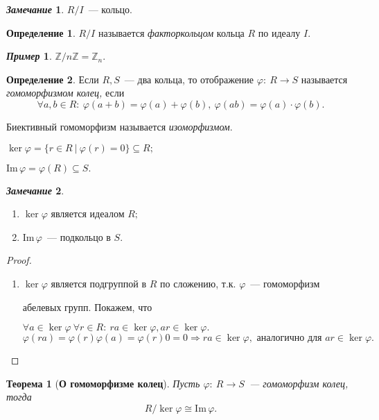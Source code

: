 \documentclass[a4paper, 14pt]{extarticle}
\newcommand{\n}{\par}
\newcommand{\integers}{\mathbb{Z}}
\newcommand{\im}{\mathrm{Im} \,}
\renewcommand{\phi}{\varphi}
\theoremstyle{definition}
\newtheorem*{exmpl*}{\textit{Пример}}
\newtheorem*{remark}{\textit{Замечание}}
\newtheorem{definition}{Определение}
\theoremstyle{plain}
\newtheorem*{theorem*}{Теорема}
\numberwithin{theorem}{section}
\numberwithin{definition}{section}
\numberwithin{statement}{section}
\numberwithin{lemma}{section}
\numberwithin{consequence}{section}
\begin{document}
	\begin{remark}
		$R/I$~--- кольцо.
	\end{remark}
	\begin{definition}
		$R/I$ называется \textit{факторкольцом} кольца $R$ по идеалу $I.$
	\end{definition}
	\begin{exmpl*}
		$\integers/n\integers = \integers_n.$
	\end{exmpl*}
	\begin{definition}
		Если $R, S$~--- два кольца, то отображение ${\phi{:} \ R \rightarrow S}$ называется \textit{гомоморфизмом колец,} если
		\begin{equation*}
			\forall a,b \in R{:} \ \phi(a + b) = \phi(a) + \phi(b), \ \phi(ab) = \phi(a) \cdot \phi(b).
		\end{equation*} \n
		Биективный гомоморфизм называется \textit{изоморфизмом}.\n
		${\ker \phi = \{r \in R \ | \ \phi(r) = 0\} \subseteq R;}$ \n
		${\im \phi = \phi(R) \subseteq S.}$
	\end{definition}
	\begin{remark}
		\
		\begin{enumerate}
			\setlength\itemsep{0.25em}
			\item $\ker \phi$ является идеалом $R;$
			\item $\im \phi$~--- подкольцо в $S.$
		\end{enumerate}
	\end{remark}
	\begin{proof}
		\
		\begin{enumerate}
			\setlength\itemsep{0.25em}
			\item $\ker \phi$ является подгруппой в $R$ по сложению, т.к. $\phi$~--- гомоморфизм \n
			абелевых групп. Покажем, что \n ${\forall a \in \ker \phi \ \forall r \in R{:} \ ra \in \ker \phi, ar \in \ker \phi.}$ 
			\begin{equation*}
				\phi(ra) = \phi(r)\phi(a) = \phi(r)0 = 0 \Longrightarrow ra \in \ker \phi, \text{ аналогично для } ar \in \ker \phi.
			\end{equation*}
		\end{enumerate}
	\end{proof}
	\newpage
	\begin{theorem*}[\textbf{О гомоморфизме колец}]
		Пусть ${\phi{:} \ R \rightarrow S}$~--- гомоморфизм колец, тогда
		\begin{equation*}
			R/\ker \phi \cong \im \phi.
		\end{equation*}
	\end{theorem*}
\end{document}
